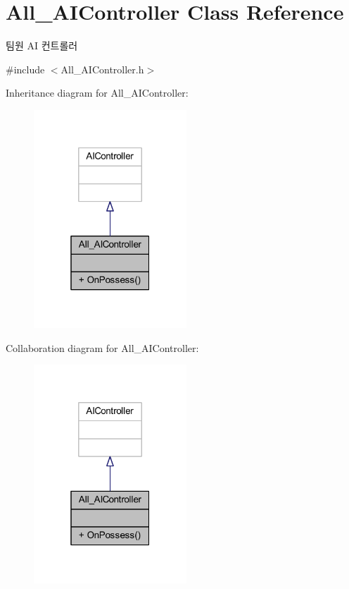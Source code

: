 \hypertarget{class_all___a_i_controller}{}\section{All\+\_\+\+A\+I\+Controller Class Reference}
\label{class_all___a_i_controller}


팀원 AI 컨트롤러  




{\ttfamily \#include $<$All\+\_\+\+A\+I\+Controller.\+h$>$}



Inheritance diagram for All\+\_\+\+A\+I\+Controller\+:
\nopagebreak
\begin{figure}[H]
\begin{center}
\leavevmode
\includegraphics[width=163pt]{class_all___a_i_controller__inherit__graph}
\end{center}
\end{figure}


Collaboration diagram for All\+\_\+\+A\+I\+Controller\+:
\nopagebreak
\begin{figure}[H]
\begin{center}
\leavevmode
\includegraphics[width=163pt]{class_all___a_i_controller__coll__graph}
\end{center}
\end{figure}
